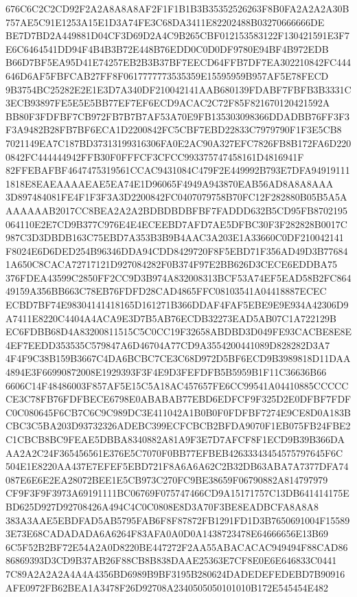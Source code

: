 \documentclass[UTF8,fontset=fandol,zihao=-4,a4paper]{ctexart}
\begin{document}
{{676C6C2C2CD92F2A2A8A8A8AF2F1F1B1B3B35352526263F8B0FA2A2A2A30B757AE5C91E1253A15E1D3A74FE3C68DA3411E82202488B03270666666DE
BE7D7BD2A449881D04CF3D69D2A4C9B265CBF012153583122F130421591E3F7E6C6464541DD94F4B4B3B72E448B76EDD0C0D0DF9780E94BF4B972EDB
B66D7BF5EA95D41E74257EB2B3B37BF7EECD64FFB7DF7EA302210842FC444646D6AF5FBFCAB27FF8F0617777773535359E15595959B957AF5E78FECD
9B3754BC25282E2E1E3D7A340DF210042141AAB680139FDABF7FBFB3B3331C3ECB93897FE5E5E5BB77EF7EF6ECD9ACAC2C72F85F821670120421592A
BB80F3FDFBF7CB972FB7B7B7AF53A70E9FB135303098366DDADBB76FF3F3F3A9482B28FB7BF6ECA1D2200842FC5CBF7EBD22833C7979790F1F3E5CB8
7021149EA7C187BD37313199316306FA0E2AC90A327EFC7826FB8B172FA6D2200842FC444444942FFB30F0FFFCF3CFCC993375747458161D4816941F
82FFEBAFBF4647475319561CCAC9431084C479F2E449992B793E7DFA949191111818E8EAEAAAAEAE5EA74E1D96065F4949A943870EAB56AD8A8A8AAA
3D897484081FE4F1F3F3A3D2200842FC0407079758B70FC12F282880B05B5A5AAAAAAAB2017CC8BEA2A2A2BDBDBDBFBF7FADDD632B5CD95FB8702195
064110E2E7CD9B377C976E4E4ECEEBD7AFD7AE5DFBC30F3F282828B0017C987C3D3DBDB163C75EBD7A353B3B9B4AAC3A203E1A33660C0DF210042141
F8024E6D6DED254B96346DDA94CDD8429720F8F5EBD71F356AD49D3B776841A650C8CACA72717121D927084282F0B374F97E2BB626D3CECE6EDDBA75
376FDEA43599C2850FF2CC9D3B974A832008313BCF53A74EF5EAD58B2FC86449159A356BB663C78EB76FDFD28CAD4865FFC08103541A04418887ECEC
ECBD7BF74E98304141418165D161271B366DDAF4FAF5EBE9E9E934A42306D9A7411E8220C4404A4ACA9E3D7B5AB76ECDB32273EAD5AB07C1A722129B
EC6FDBB68D4A83200811515C5C0CC19F32658ABDBD3D049FE93CACBE8E8E4EF7EEDD353535C579847A6D46704A77CD9A3554200441089D828282D3A7
4F4F9C38B159B3667C4DA6BCBC7CE3C68D972D5BF6ECD9B3989818D11DAA4894E3F66990872008E1929393F3F4E9D3FEFDFB5B5959B1F11C36636B66
6606C14F48486003F857AF5E15C5A18AC457657FE6CC99541A04410885CCCCCCE3C78FB76FDFBECE6798E0ABABAB77EBD6EDFCF9F325D2E0DFBF7FDF
C0C080645F6CB7C6C9C989DC3E411042A1B0B0F0FDFBF7274E9CE8D0A183BCBC3C5BA203D93732326ADEBC399ECFCBCB2BFDA9070F1EB075FB24FBE2
C1CBCB8BC9FEAE5DBBA8340882A81A9F3E7D7AFCF8F1ECD9B39B366DAAA2A2C24F365456561E376E5C7070F0BB77EFBEB42633343454575797645F6C
504E1E8220AA437E7EFEF5EBD721F8A6A6A62C2B32DB63ABA7A7377DFA74087E6E6E2EA28072BEE1E5CB973C270FC9BE38659F06790882A814797979
CF9F3F9F3973A69191111BC06769F075747466CD9A15171757C13DB641414175EBD625D927D92708426A494C4C0C0808E8D3A70F3BE8EADBCFA8A8A8
383A3AAE5EBDFAD5AB5795FAB6F8F87872FB1291FD1D3B7650691004F155893E73E68CADADADA6A6264F83AFA0A0D0A1438723478E64666656E13B69
6C5F52B2BF72E54A2A0D8220BE447272F2AA55ABACACAC949494F88CAD8686869393D3CD9B37AB26F88CB8B838DAAE25363E7CF8E0E6E646833C0441
7C89A2A2A2A4A4A4356BD6989B9BF3195B280624DADEDEFEDEBD7B90916AFE0972FB62BEA1A3478F26D92708A2340505050101010B172E545454E482
}}
\end{document}
